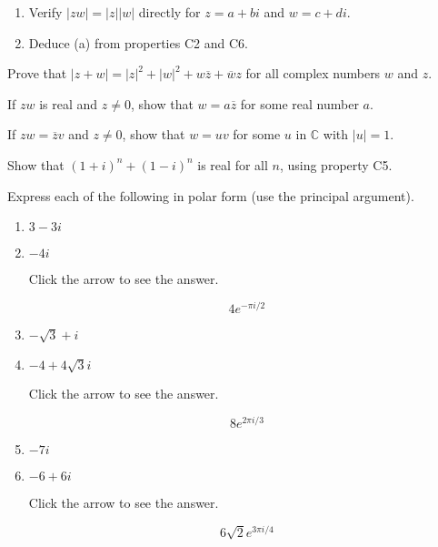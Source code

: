 \documentclass{ximera}
\begin{document}
\begin{problem}\label{prb:A.13}
\begin{enumerate}[label={\alph*.}]
\item Verify $|zw| = |z||w|$ directly for $z = a + bi$ and $w = c + di$.

\item Deduce (a) from properties C2 and C6.

\end{enumerate}
\end{problem}

\begin{problem}\label{prb:A.14}
Prove that $|z+w| = |z|^2 + |w|^2 + w\overline{z} + \overline{w}z$
 for all complex numbers $w$ and $z$.
\end{problem}

\begin{problem}\label{prb:A.15}
If $zw$ is real and $z \neq 0$, show that $w = a \overline{z}$
 for some real number $a$.
\end{problem}

\begin{problem}\label{prb:A.16}
If $zw = \overline{z}v$
 and $z \neq 0$, show that $w = uv$ for some $u$ in $\mathbb{C}$  with $|u| = 1$.
\end{problem}

\begin{problem}\label{prb:A.17}
Show that $(1 + i)^{n} + (1 - i)^{n}$ is real for all $n$, using property C5.
\end{problem}

\begin{problem}\label{prb:A.18}
Express each of the following in polar form (use the principal argument).

\begin{enumerate}
\item $3 - 3i$
\item $-4i$

Click the arrow to see the answer.
\begin{expandable}
 $$4e^{-\pi i/2}$$
\end{expandable}

\item $-\sqrt{3} + i$
\item $-4 + 4\sqrt{3}i$

Click the arrow to see the answer.
\begin{expandable}
$$8e^{2\pi i/3}$$
\end{expandable}

\item $-7i$
\item $-6 + 6i$

Click the arrow to see the answer.
\begin{expandable}
 $$6\sqrt{2}e^{3\pi i/4}$$
\end{expandable}

\end{enumerate}
\end{problem}
\end{document}
